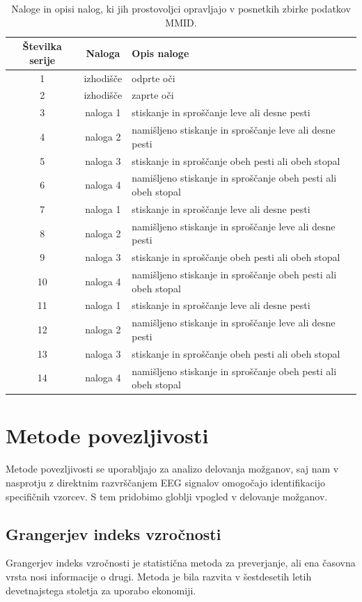 \begin{table}[h]
\centering
\begin{tabular}{|c|c|l|}

\hline
Številka serije & Naloga &Opis naloge \\
\hline
1 & izhodišče & odprte oči  \\
\hline
2 & izhodišče & zaprte oči  \\
\hline
3 & naloga 1 & stiskanje in sproščanje leve ali desne pesti \\
\hline
4 & naloga 2 &namišljeno stiskanje in sproščanje leve ali desne pesti  \\
\hline
5 & naloga 3 &stiskanje in sproščanje obeh pesti ali obeh stopal \\
\hline
6 & naloga 4 &namišljeno stiskanje in sproščanje obeh pesti ali obeh stopal  \\
\hline
7 & naloga 1 &stiskanje in sproščanje leve ali desne pesti \\
\hline
8 & naloga 2 &namišljeno stiskanje in sproščanje leve ali desne pesti  \\
\hline
9 & naloga 3 &stiskanje in sproščanje obeh pesti ali obeh stopal \\
\hline
10 & naloga 4 &namišljeno stiskanje in sproščanje obeh pesti ali obeh stopal  \\
\hline
11 & naloga 1 &stiskanje in sproščanje leve ali desne pesti \\
\hline
12 &naloga 2 &namišljeno stiskanje in sproščanje leve ali desne pesti  \\
\hline
13 & naloga 3 &stiskanje in sproščanje obeh pesti ali obeh stopal \\
\hline
14 & naloga 4 &namišljeno stiskanje in sproščanje obeh pesti ali obeh stopal  \\

\hline
\end{tabular}
\caption{Naloge in opisi nalog, ki jih prostovoljci opravljajo v posnetkih zbirke podatkov MMID.}
\end{table}


\section{Metode povezljivosti}
Metode povezljivosti se uporabljajo za analizo delovanja možganov, saj nam v nasprotju z direktnim razvrščanjem EEG signalov omogočajo identifikacijo specifičnih vzorcev. S tem pridobimo globlji vpogled v delovanje možganov.

\subsection{Grangerjev indeks vzročnosti}
Grangerjev indeks vzročnosti je statistična metoda za preverjanje, ali ena časovna vrsta nosi informacije o drugi. Metoda je bila razvita v šestdesetih letih devetnajstega stoletja za uporabo ekonomiji.\cite{cohenAnalyzingNeuralTime2014}

